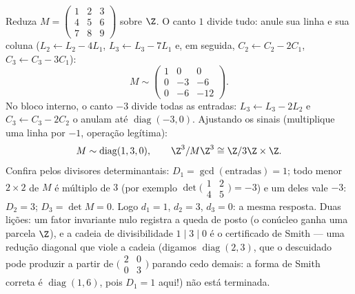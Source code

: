 \begin{example}
\label{ex:b3:modules:smithworked}
Reduza $M = \begin{pmatrix} 1 & 2 & 3\\ 4 & 5 & 6\\ 7 & 8 & 9
\end{pmatrix}$ sobre $\Z$. O canto $1$ divide tudo: anule sua
linha e sua coluna ($L_2 \leftarrow L_2 - 4L_1$, $L_3
\leftarrow L_3 - 7L_1$ e, em seguida, $C_2 \leftarrow C_2 - 2C_1$, $C_3
\leftarrow C_3 - 3C_1$):
\[
M \sim \begin{pmatrix} 1 & 0 & 0\\ 0 & -3 & -6\\ 0 & -6 & -12
\end{pmatrix} .
\]
No bloco interno, o canto $-3$ divide todas as entradas: $L_3
\leftarrow L_3 - 2L_2$ e
$C_3 \leftarrow C_3 - 2C_2$ o anulam até $\operatorname{diag}(-3, 0)$. Ajustando os sinais (multiplique uma linha
por $-1$, operação legítima):
\[
M \sim \operatorname{diag}(1, 3, 0),
\qquad
\Z^3/M\Z^3 \cong \Z/3\Z \times \Z .
\]
Confira pelos divisores determinantais: $D_1 =
\gcd(\text{entradas}) = 1$; todo menor $2\times2$ de
$M$ é múltiplo de $3$ (por exemplo $\det\bigl(\begin{smallmatrix}1 & 2\\ 4
& 5\end{smallmatrix}\bigr) = -3$) e um deles vale
$-3$: $D_2 =
3$; $D_3 = \det M = 0$. Logo $d_1 = 1$, $d_2 = 3$, $d_3 = 0$: a mesma resposta. Duas
lições: um fator invariante nulo registra a queda de posto (o conúcleo
ganha uma parcela  $\Z$), e a cadeia de divisibilidade $1 \mid 3 \mid 0$ é
o certificado de Smith --- uma redução diagonal que viole a cadeia
(digamos $\operatorname{diag}(2, 3)$, que o descuidado pode produzir a partir de $\bigl(\begin{smallmatrix}2 & 0\\ 0 &
3\end{smallmatrix}\bigr)$ parando
cedo demais: a forma de Smith correta é $\operatorname{diag}(1, 6)$, pois $D_1 = 1$ aqui!) não
está terminada.
\end{example}

